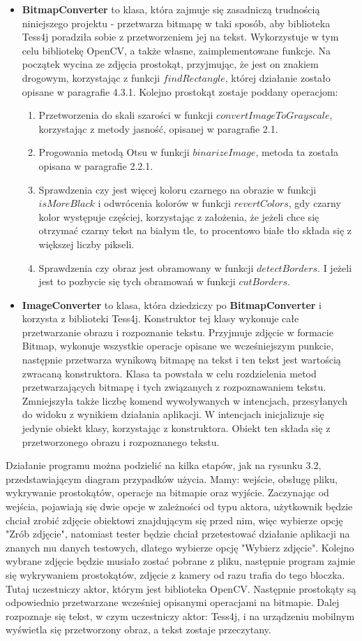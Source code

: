 \documentclass[eng,oneside]{mgr}
\begin{document}
\begin{itemize}
\item \textbf{BitmapConverter} to klasa, która zajmuje się zasadniczą trudnością niniejszego projektu - przetwarza bitmapę w taki sposób, aby biblioteka Tess4j poradziła sobie z przetworzeniem jej na tekst. Wykorzystuje w tym celu bibliotekę OpenCV, a także własne, zaimplementowane funkcje. Na początek wycina ze zdjęcia prostokąt, przyjmując, że jest on znakiem drogowym, korzystając z funkcji $findRectangle$, której działanie zostało opisane w paragrafie 4.3.1. Kolejno prostokąt zostaje poddany operacjom: 
\begin{enumerate}
\item Przetworzenia do skali szarości w funkcji $convertImageToGrayscale$, korzystając z metody jasność, opisanej w paragrafie 2.1.
\item Progowania metodą Otsu w funkcji $binarizeImage$, metoda ta została opisana w paragrafie 2.2.1.
\item Sprawdzenia czy jest więcej koloru czarnego na obrazie w funkcji $isMoreBlack$ i odwrócenia kolorów w funkcji $revertColors$, gdy czarny kolor występuje częściej, korzystając z założenia, że jeżeli chce się otrzymać czarny tekst na białym tle, to procentowo białe tło składa się z większej liczby pikseli.
\item Sprawdzenia czy obraz jest obramowany w funkcji $detectBorders$. I jeżeli jest to pozbycie się tych obramowań w funkcji $cutBorders$.
\end{enumerate}
\item \textbf{ImageConverter} to klasa, która dziedziczy po \textbf{BitmapConverter} i korzysta z biblioteki Tess4j. Konstruktor tej klasy wykonuje całe przetwarzanie obrazu i rozpoznanie tekstu. Przyjmuje zdjęcie w formacie Bitmap, wykonuje wszystkie operacje opisane we wcześniejszym punkcie, następnie przetwarza wynikową bitmapę na tekst i ten tekst jest wartością zwracaną konstruktora. Klasa ta powstała w celu rozdzielenia metod przetwarzających bitmapę i tych związanych z rozpoznawaniem tekstu. Zmniejszyła także liczbę komend wywoływanych w intencjach, przesyłanych do widoku z wynikiem działania aplikacji. W intencjach inicjalizuje się jedynie obiekt klasy, korzystając z konstruktora. Obiekt ten składa się z przetworzonego obrazu i rozpoznanego tekstu.
\end{itemize}
Działanie programu można podzielić na kilka etapów, jak na rysunku 3.2, przedstawiającym diagram przypadków użycia. Mamy: wejście, obsługę pliku, wykrywanie prostokątów, operacje na bitmapie oraz wyjście. Zaczynając od wejścia, pojawiają się dwie opcje w zależności od typu aktora, użytkownik będzie chciał zrobić zdjęcie obiektowi znajdującym się przed nim, więc wybierze opcję "Zrób zdjęcie", natomiast tester będzie chciał przetestować działanie aplikacji na znanych mu danych testowych, dlatego wybierze opcję "Wybierz zdjęcie". Kolejno wybrane zdjęcie będzie musiało zostać pobrane z pliku, następnie program zajmie się wykrywaniem prostokątów, zdjęcie z kamery od razu trafia do tego bloczka. Tutaj uczestniczy aktor, którym jest biblioteka OpenCV. Następnie prostokąty są odpowiednio przetwarzane wcześniej opisanymi operacjami na bitmapie. Dalej rozpoznaje się tekst, w czym uczestniczy aktor: Tess4j, i na urządzeniu mobilnym wyświetla się przetworzony obraz, a tekst zostaje przeczytany.
\end{document}
